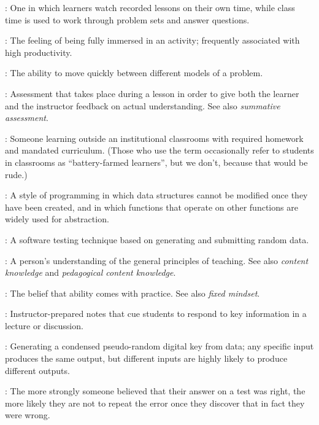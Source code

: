 \begin{description}
: One in which
learners watch recorded lessons on their own time, while class time is
used to work through problem sets and answer questions.

: The feeling of being fully immersed in an
activity; frequently associated with high productivity.

: The ability
to move quickly between different models of a problem.

: Assessment
that takes place during a lesson in order to give both the learner and
the instructor feedback on actual understanding. See also \emph{summative
assessment}.

: Someone learning
outside an institutional classrooms with required homework and mandated
curriculum. (Those who use the term occasionally refer to students in
classrooms as ``battery-farmed learners'', but we don't, because that
would be rude.)

: A style
of programming in which data structures cannot be modified once they
have been created, and in which functions that operate on other
functions are widely used for abstraction.

: A software testing technique
based on generating and submitting random data.

:
A person's understanding of the general principles of teaching. See also
\emph{content knowledge} and \emph{pedagogical content knowledge}.

: The belief that ability
comes with practice. See also \emph{fixed mindset}.

: Instructor-prepared notes
that cue students to respond to key information in a lecture or
discussion.

: Generating a condensed pseudo-random
digital key from data; any specific input produces the same output, but
different inputs are highly likely to produce different outputs.

: The more
strongly someone believed that their answer on a test was right, the
more likely they are not to repeat the error once they discover that in
fact they were wrong.


\end{description}
